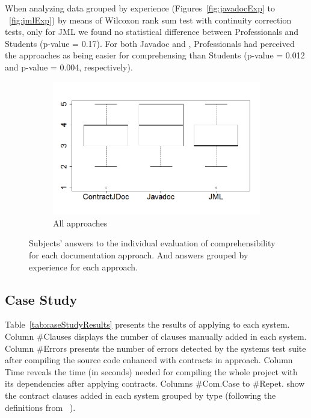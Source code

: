 When analyzing data grouped by experience (Figures~\ref{fig:javadocExp} to
~\ref{fig:jmlExp}) by means of Wilcoxon rank sum test with continuity correction
tests, only for JML we found no statistical difference between Professionals and
Students (p-value = 0.17). For both Javadoc and \contractjdoc{}, Professionals
had perceived the approaches as being easier for comprehensing than Students
(p-value = 0.012 and p-value = 0.004, respectively).






\begin{figure}
\centering
\begin{subfigure}{.48\textwidth}
\includegraphics[width=1\linewidth]{figs/boxplotApproachesSurveyStudy}
\caption{All approaches}
\label{fig:allApproaches}
\end{subfigure}

\caption{Subjects' answers to the individual evaluation of comprehensibility for
each documentation approach. And answers grouped by experience for each
approach.}
\label{fig:surveyResults}
\end{figure}



\subsection{Case Study}

Table~\ref{tab:caseStudyResults} presents the results of applying \contractjdoc{} to each system.
Column \#Clauses displays the number of clauses manually added in each system.
Column \#Errors presents the number of errors detected by the systems test suite after compiling the source code enhanced with contracts in
\contractjdoc{} approach. Column Time reveals the time (in seconds) needed for compiling the whole
project with its dependencies after applying \contractjdoc{} contracts. Columns \#Com.Case to \#Repet.
show the contract clauses added in each system grouped by type (following the
definitions from ~\cite{typeContracts}).

